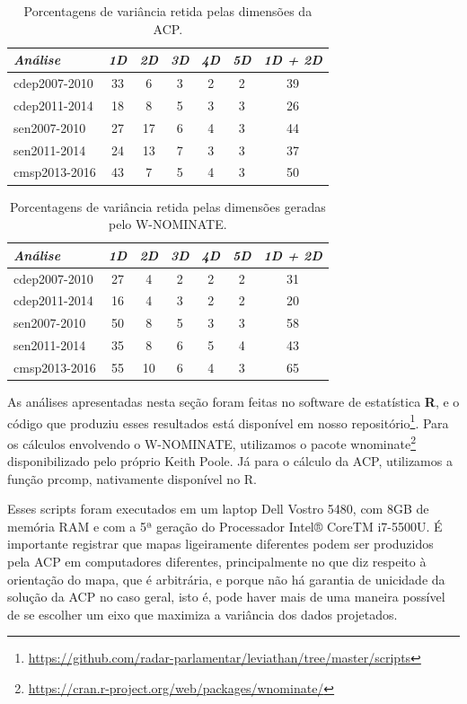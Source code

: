 \documentclass[
	article,			%
	12pt,				%
    twoside,			%
	a4paper,			%
	english,			%
	french,				%
	spanish,			%
	brazil,				%
	]{abntex2}
\newcommand\wnominate{W-NOMINATE\xspace}
\begin{document}
\begin{table}
\centering
\begin{tabular}{l c c c c c | c}
\itshape Análise & \itshape 1D & \itshape 2D & \itshape 3D & \itshape 4D & \itshape 5D & \itshape 1D + 2D \\
\hline
cdep2007-2010 & 33 &  6 & 3 & 2 & 2 & 39  \\ 
cdep2011-2014 & 18 &  8 & 5 & 3 & 3 & 26  \\ 
sen2007-2010  & 27 & 17 & 6 & 4 & 3 & 44  \\ 
sen2011-2014  & 24 & 13 & 7 & 3 & 3 & 37  \\ 
cmsp2013-2016 & 43 &  7 & 5 & 4 & 3 & 50  \\ 
\end{tabular} 
\caption{Porcentagens de variância retida pelas dimensões da ACP.}
\label{tab:variacao-explicada-acp}
\end{table}

\begin{table}
\centering
\begin{tabular}{l c c c c c | c}
\itshape Análise & \itshape 1D & \itshape 2D & \itshape 3D & \itshape 4D & \itshape 5D & \itshape 1D + 2D \\
\hline
cdep2007-2010 & 27 & 4 & 2 & 2 & 2 & 31  \\ 
cdep2011-2014 & 16 & 4 & 3 & 2 & 2 & 20  \\ 
sen2007-2010  & 50 & 8 & 5 & 3 & 3 & 58  \\ 
sen2011-2014  & 35 & 8 & 6 & 5 & 4 & 43  \\ 
cmsp2013-2016 & 55 & 10 & 6 & 4 & 3 & 65  \\ 
\end{tabular} 
\caption{Porcentagens de variância retida pelas dimensões geradas pelo \wnominate.}
\label{tab:variacao-explicada-wnominate}
\end{table}

As análises apresentadas nesta seção foram feitas no software de estatística \textbf{R}, e o código que produziu esses resultados está disponível em nosso repositório\footnote{\url{https://github.com/radar-parlamentar/leviathan/tree/master/scripts}}. Para os cálculos envolvendo o \wnominate, utilizamos o pacote \textsf{wnominate}\footnote{\url{https://cran.r-project.org/web/packages/wnominate/}} disponibilizado pelo próprio Keith Poole. Já para o cálculo da ACP, utilizamos a função \textsf{prcomp}, nativamente disponível no R.

Esses scripts foram executados em um laptop Dell Vostro 5480, com 8GB de memória RAM e com a 5ª geração do Processador Intel® CoreTM i7-5500U. É importante registrar que mapas ligeiramente diferentes podem ser produzidos pela ACP em computadores diferentes, principalmente no que diz respeito à orientação do mapa, que é arbitrária, e porque não há garantia de unicidade da solução da ACP no caso geral, isto é, pode haver mais de uma maneira possível de se escolher um eixo que maximiza a variância dos dados projetados.
\end{document}
